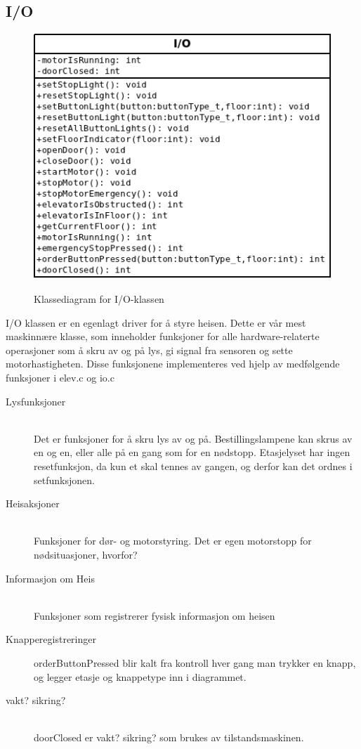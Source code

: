 \subsection{I/O}
\begin{figure}
\centering
\includegraphics[scale=0.6]{io.png}
\label{fig:class_ui}
\caption{Klassediagram for I/O-klassen}
\end{figure}
I/O klassen er en egenlagt driver for å styre heisen. Dette er vår mest maskinnære klasse, som inneholder funksjoner for alle hardware-relaterte operasjoner som å skru av og på lys, gi signal fra sensoren og sette motorhastigheten. Disse funksjonene implementeres ved hjelp av medfølgende funksjoner i elev.c og io.c
\begin{description}
\item[Lysfunksjoner]\hfill \\
Det er funksjoner for å skru lys av og på. Bestillingslampene kan skrus av en og en, eller alle på en gang som for en nødstopp. Etasjelyset har ingen resetfunksjon, da kun et skal tennes av gangen, og derfor kan det ordnes i setfunksjonen.
\item[Heisaksjoner]\hfill \\
Funksjoner for dør- og motorstyring. Det er egen motorstopp for nødsituasjoner, {\Huge hvorfor?}
\item[Informasjon om Heis]\hfill \\
Funksjoner som registrerer fysisk informasjon om heisen
\item[Knapperegistreringer]
orderButtonPressed blir kalt fra kontroll hver gang man trykker en knapp, og legger etasje og knappetype inn i diagrammet.
\item[vakt? sikring?]\hfill \\
doorClosed er vakt? sikring? som brukes av tilstandsmaskinen.
\end{description}
